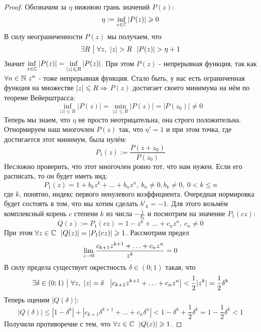 \begin{proof}
	Обозначим за $\eta$ нижнюю грань значений $P(z)$:
	\[
		\eta := \inf\limits_{z \in \mathbb{C}} |P(z)| \geqslant 0
	\]
	В силу неограниченности $P(z)$ мы получаем, что
	\[
		\exists R \ \big|\  \forall z,\ |z| > R\ \ |P(z)| > \eta + 1
	\]
	Значит $\inf\limits_{z \in \mathbb{C}} |P(z)| = \inf\limits_{|z| \leqslant R} |P(z)|$. При этом $P(z)$ - непрерывная функция, так как $\forall n \in \mathbb{N}\ z^n$ - тоже непрерывная функция. Стало быть, у нас есть ограниченная функция на множестве $|z| \leqslant R \Rightarrow $ $P(z)$ достигает своего минимума на нём по теореме Вейерштрасса: 
	\[
		\inf\limits_{|z| \le R} |P(z)| = \min\limits_{|z| \le R} |P(z)| = |P(z_0)| \neq 0
	\]
	Теперь мы знаем, что $\eta$ не просто неотрицательна, она строго положительна. Отнормируем наш многочлен $P(z)$ так, что $\eta' = 1$ и при этом точка, где достигается этот минимум, была нулём:
	\[
		P_1(z) := \frac{P(z + z_0)}{P(z_0)}
	\]
	Несложно проверить, что этот многочлен ровно тот, что нам нужен. Если его расписать, то он будет иметь вид:
	\[
		P_1(z) = 1 + b_k z^k + \ldots + b_n z^n,\ b_n \neq 0, b_k \neq 0,\ 0 < k \le n 
	\]
	где $k$, понятно, индекс первого ненулевого коэффициента. Очередная нормировка будет состоять в том, что мы хотим сделать $b'_k = -1$. Для этого возьмём комплексный корень $c$ степени $k$ из числа $-\frac{1}{b_k}$ и посмотрим на значение $P_1(cz)$:
	\[
		Q(z) := P_1(cz) = 1 - z^k + \ldots + c_n z^n,\ c_n \neq 0
	\]
	При этом $\forall z \in \mathbb{C}\ \ |Q(z)| = |P_1(cz)| \geqslant 1$. Рассмотрим предел
	\[
		\lim\limits_{z \to 0} \frac{c_{k + 1} z^{k + 1} + \ldots + c_n z^n}{z^k} = 0
	\]
	В силу предела существует окрестность $\delta \in (0; 1)$ такая, что
	\[
		\exists \delta \in (0; 1) \ \big|\  \forall z,\ |z| = \delta\ \ \left|c_{k + 1}z^{k + 1} + \ldots + c_n z^n\right| < \frac{1}{2}|z^k| = \frac{1}{2}\delta^k
	\]
	Теперь оценим $|Q(\delta)|$:
	\[
		|Q(\delta)| \le |1 - \delta^k| + |c_{k + 1}\delta^{k + 1} + \ldots + c_n \delta^n| < 1 - \delta^k + \frac{1}{2}\delta^k = 1 - \frac{1}{2}\delta^k < 1
	\]
	Получили противоречие с тем, что $\forall z \in \mathbb{C}\ \ |Q(z)| \geqslant 1$.
\end{proof}